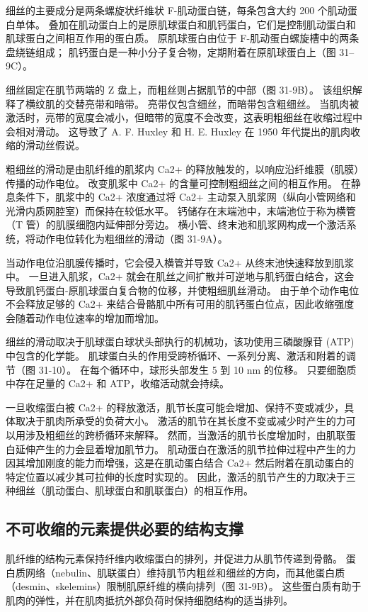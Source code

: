 细丝的主要成分是两条螺旋状纤维状 F-肌动蛋白链，每条包含大约 200 个肌动蛋白单体。 叠加在肌动蛋白上的是原肌球蛋白和肌钙蛋白，它们是控制肌动蛋白和肌球蛋白之间相互作用的蛋白质。 原肌球蛋白由位于 F-肌动蛋白螺旋槽中的两条盘绕链组成； 肌钙蛋白是一种小分子复合物，定期附着在原肌球蛋白上（图 31–9C）。

细丝固定在肌节两端的 Z 盘上，而粗丝则占据肌节的中部（图 31-9B）。 该组织解释了横纹肌的交替亮带和暗带。 亮带仅包含细丝，而暗带包含粗细丝。 当肌肉被激活时，亮带的宽度会减小，但暗带的宽度不会改变，这表明粗细丝在收缩过程中会相对滑动。 这导致了 A. F. Huxley 和 H. E. Huxley 在 1950 年代提出的肌肉收缩的滑动丝假说。

粗细丝的滑动是由肌纤维的肌浆内 Ca2+ 的释放触发的，以响应沿纤维膜（肌膜）传播的动作电位。 改变肌浆中 Ca2+ 的含量可控制粗细丝之间的相互作用。 在静息条件下，肌浆中的 Ca2+ 浓度通过将 Ca2+ 主动泵入肌浆网（纵向小管网络和光滑内质网腔室）而保持在较低水平。 钙储存在末端池中，末端池位于称为横管（T 管）的肌膜细胞内延伸部分旁边。 横小管、终末池和肌浆网构成一个激活系统，将动作电位转化为粗细丝的滑动（图 31-9A）。

当动作电位沿肌膜传播时，它会侵入横管并导致 Ca2+ 从终末池快速释放到肌浆中。 一旦进入肌浆，Ca2+ 就会在肌丝之间扩散并可逆地与肌钙蛋白结合，这会导致肌钙蛋白-原肌球蛋白复合物的位移，并使粗细肌丝滑动。 由于单个动作电位不会释放足够的 Ca2+ 来结合骨骼肌中所有可用的肌钙蛋白位点，因此收缩强度会随着动作电位速率的增加而增加。

细丝的滑动取决于肌球蛋白球状头部执行的机械功，该功使用三磷酸腺苷 (ATP) 中包含的化学能。 肌球蛋白头的作用受跨桥循环、一系列分离、激活和附着的调节（图 31-10）。 在每个循环中，球形头部发生 5 到 10 nm 的位移。 只要细胞质中存在足量的 Ca2+ 和 ATP，收缩活动就会持续。

一旦收缩蛋白被 Ca2+ 的释放激活，肌节长度可能会增加、保持不变或减少，具体取决于肌肉所承受的负荷大小。 激活的肌节在其长度不变或减少时产生的力可以用涉及粗细丝的跨桥循环来解释。 然而，当激活的肌节长度增加时，由肌联蛋白延伸产生的力会显着增加肌节力。 肌动蛋白在激活的肌节拉伸过程中产生的力因其增加刚度的能力而增强，这是在肌动蛋白结合 Ca2+ 然后附着在肌动蛋白的特定位置以减少其可拉伸的长度时实现的。 因此，激活的肌节产生的力取决于三种细丝（肌动蛋白、肌球蛋白和肌联蛋白）的相互作用。

\subsection{不可收缩的元素提供必要的结构支撑}
肌纤维的结构元素保持纤维内收缩蛋白的排列，并促进力从肌节传递到骨骼。 蛋白质网络（nebulin、肌联蛋白）维持肌节内粗丝和细丝的方向，而其他蛋白质（desmin、skelemins）限制肌原纤维的横向排列（图 31-9B）。 这些蛋白质有助于肌肉的弹性，并在肌肉抵抗外部负荷时保持细胞结构的适当排列。

